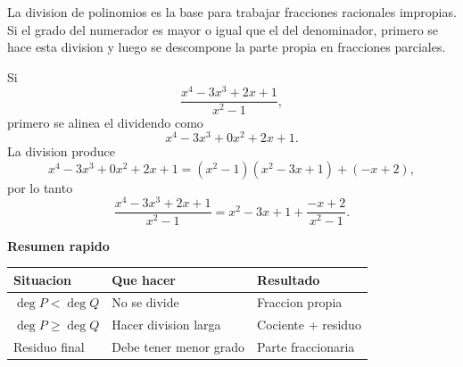 \documentclass[12pt, letterpaper]{article}
\newenvironment{ejemplo}{%
  \begin{tcolorbox}[casobase, colframe=azul, colbacktitle=azulclaro, coltitle=azultitulo,
    title=Ejemplo resuelto]
}{\end{tcolorbox}}
\newenvironment{observacion}{%
  \begin{tcolorbox}[subcuadro, colback=verdeclaro, colframe=verde,
    coltitle=verdetitulo, colbacktitle=verdeclaro,
    title=Observacion importante]
}{\end{tcolorbox}}
\begin{document}
\begin{observacion}
La division de polinomios es la base para trabajar fracciones racionales impropias. Si el grado del numerador es mayor o igual que el del denominador, primero se hace esta division y luego se descompone la parte propia en fracciones parciales.
\end{observacion}

\begin{ejemplo}
Si
\[
\frac{x^4-3x^3+2x+1}{x^2-1},
\]
primero se alinea el dividendo como
\[
x^4-3x^3+0x^2+2x+1.
\]
La division produce
\[
x^4-3x^3+0x^2+2x+1 = (x^2-1)(x^2-3x+1) + (-x+2),
\]
por lo tanto
\[
\frac{x^4-3x^3+2x+1}{x^2-1} = x^2-3x+1 + \frac{-x+2}{x^2-1}.
\]
\end{ejemplo}

\begin{center}
\bfseries Resumen rapido\\[8pt]
\renewcommand{\arraystretch}{1.6}
\begin{tabular}{>{\centering\arraybackslash}m{4.2cm}
                >{\centering\arraybackslash}m{5.2cm}
                >{\centering\arraybackslash}m{4cm}}
\toprule
\textbf{Situacion} & \textbf{Que hacer} & \textbf{Resultado} \\
\midrule
$\deg P < \deg Q$ & No se divide & Fraccion propia \\
$\deg P \geq \deg Q$ & Hacer division larga & Cociente + residuo \\
Residuo final & Debe tener menor grado & Parte fraccionaria \\
\bottomrule
\end{tabular}
\end{center}
\end{document}
